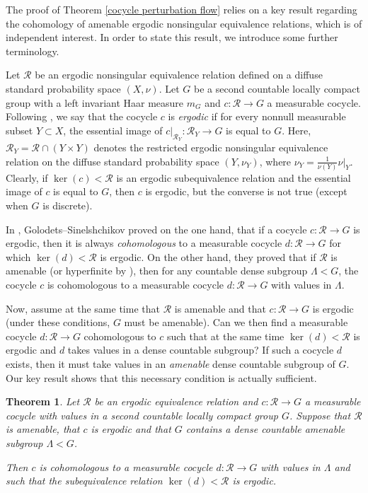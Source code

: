 \documentclass[a4paper,11pt]{amsart}
\numberwithin{equation}{section}
\newtheorem{letterthm}{Theorem}
\theoremstyle{definition}
\newcommand{\cR}{\mathcal{R}}
\begin{document}
The proof of Theorem \ref{cocycle perturbation flow} relies on a key result regarding the cohomology of amenable ergodic nonsingular equivalence relations, which is of independent interest. In order to state this result, we introduce some further terminology.

Let $\mathcal R$ be an ergodic nonsingular equivalence relation defined on a diffuse standard probability space $(X, \nu)$. Let $G$ be a second countable locally compact group with a left invariant Haar measure $m_G$ and $c : \mathcal R \to G$ a measurable cocycle. Following \cite{GS91}, we say that the cocycle $c$ is {\em ergodic} if for every nonnull measurable subset $Y \subset X$, the essential image of $c|_{\mathcal R_Y} : \mathcal R_Y \to G$ is equal to $G$. Here, $\mathcal R_Y = \mathcal R \cap (Y \times Y)$ denotes the restricted ergodic nonsingular equivalence relation on the diffuse standard probability space $(Y, \nu_Y)$, where $\nu_Y = \frac{1}{\nu(Y)}\nu|_Y$. Clearly, if $\ker(c) < \cR$ is an ergodic subequivalence relation and the essential image of $c$ is equal to $G$, then $c$ is ergodic, but the converse is not true (except when $G$ is discrete).


In \cite{GS91}, Golodets--Sinelshchikov proved on the one hand, that if a cocycle $c : \mathcal R \to G$ is ergodic, then it is always \emph{cohomologous} to a measurable cocycle $d : \mathcal R \to G$ for which $\ker(d) < \mathcal R$ is ergodic. On the other hand, they proved that if $\mathcal R$ is amenable (or hyperfinite by \cite{CFW81}), then for any countable dense subgroup $\Lambda < G$, the cocycle $c$ is cohomologous to a measurable cocycle $d : \mathcal R \to G$ with values in $\Lambda$. 

Now, assume at the same time that $\mathcal R$ is amenable and that $c : \mathcal R \to G$ is ergodic (under these conditions, $G$ must be amenable). Can we then find a measurable cocycle $d : \mathcal R \to G$ cohomologous to $c$ such that at the same time $\ker(d) < \mathcal R$ is ergodic and $d$ takes values in a dense countable subgroup? If such a cocycle $d$ exists, then it must take values in an \emph{amenable} dense countable  subgroup of $G$. Our key result shows that this necessary condition is actually sufficient.

\begin{letterthm} \label{ergodic kernel dense subgroup}
    Let $\cR$ be an ergodic equivalence relation and  $c : \mathcal R \to G$ a measurable cocycle with values in a second countable locally compact group $G$. Suppose that $\cR$ is amenable, that $c$ is ergodic and that $G$ contains a dense countable amenable subgroup $\Lambda < G$.
    
    Then $c$ is cohomologous to a measurable cocycle $d : \cR \rightarrow G$ with values in $\Lambda$ and such that the subequivalence relation $\ker(d) < \cR$ is ergodic.
\end{letterthm}
\end{document}
